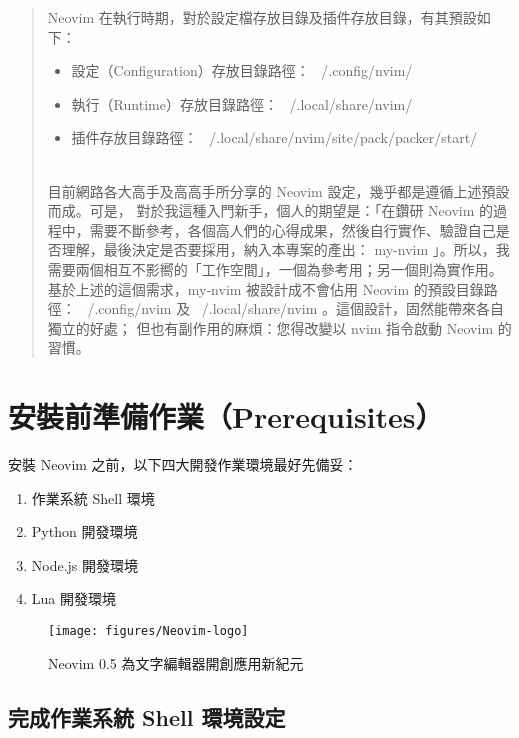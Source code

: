 \documentclass[]{article}
\begin{document}
\begin{abstract}
Neovim 在執行時期，對於設定檔存放目錄及插件存放目錄，有其預設如下：
\begin{itemize}
  \item  設定（Configuration）存放目錄路徑： ~/.config/nvim/
  \item  執行（Runtime）存放目錄路徑： ~/.local/share/nvim/
  \item  插件存放目錄路徑： ~/.local/share/nvim/site/pack/packer/start/
\end{itemize} \\

目前網路各大高手及高高手所分享的 Neovim 設定，幾乎都是遵循上述預設而成。可是， 對於我這種入門新手，個人的期望是：「在鑽研 Neovim 的過程中，需要不斷參考，各個高人們的心得成果，然後自行實作、驗證自己是否理解，最後決定是否要採用，納入本專案的產出： my-nvim 」。所以，我需要兩個相互不影嚮的「工作空間」，一個為參考用；另一個則為實作用。
\\

基於上述的這個需求，my-nvim 被設計成不會佔用 Neovim 的預設目錄路徑： ~/.config/nvim 及 ~/.local/share/nvim 。這個設計，固然能帶來各自獨立的好處； 但也有副作用的麻煩：您得改變以 nvim 指令啟動 Neovim 的習慣。
\end{abstract}
\clearpage

\tableofcontents
\clearpage

\setcounter{page}{1}

\section{安裝前準備作業（Prerequisites）}

安裝 Neovim 之前，以下四大開發作業環境最好先備妥：
\begin{enumerate}
	\item 作業系統 Shell 環境
	\item Python 開發環境
	\item Node.js 開發環境
	\item Lua 開發環境
\end{enumerate}

\begin{figure}[htbp]
	\centering
	\texttt{[image: figures/Neovim-logo]}
	\caption{Neovim 0.5 為文字編輯器開創應用新紀元}
	\label{fig:neovim-logo}
\end{figure}



\subsection{完成作業系統 Shell 環境設定}
\end{document}
